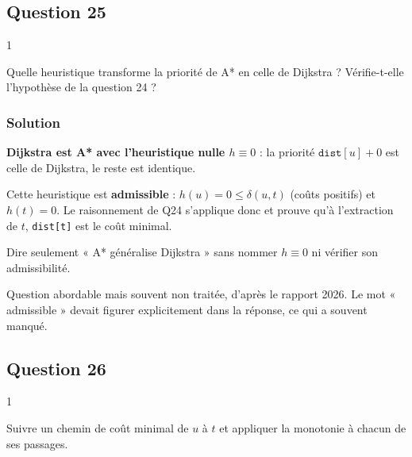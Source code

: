 \documentclass[11pt,a4paper]{article}
\begin{document}
\hypertarget{question-25}{%
\subsection{Question 25}\label{question-25}}

\begin{indication}{1}

Quelle heuristique transforme la priorité de A* en celle de Dijkstra ? Vérifie-t-elle l'hypothèse de la question 24 ?

\end{indication}

\hypertarget{solution-24}{%
\subsubsection{Solution}\label{solution-24}}

\textbf{Dijkstra est A* avec l'heuristique nulle \(h \equiv 0\)} : la priorité \(\texttt{dist}[u] + 0\) est celle de Dijkstra, le reste est identique.

Cette heuristique est \textbf{admissible} : \(h(u) = 0 \le \delta(u,t)\) (coûts positifs) et \(h(t) = 0\). Le raisonnement de Q24 s'applique donc et prouve qu'à l'extraction de \(t\), \texttt{dist{[}t{]}} est le coût minimal.

\begin{piege}

Dire seulement « A* généralise Dijkstra » sans nommer \(h \equiv 0\) ni vérifier son admissibilité.

\end{piege}

\begin{jury}

Question abordable mais souvent non traitée, d'après le rapport 2026. Le mot « admissible » devait figurer explicitement dans la réponse, ce qui a souvent manqué.

\end{jury}

\hypertarget{question-26}{%
\subsection{Question 26}\label{question-26}}

\begin{indication}{1}

Suivre un chemin de coût minimal de \(u\) à \(t\) et appliquer la monotonie à chacun de ses passages.

\end{indication}
\end{document}
